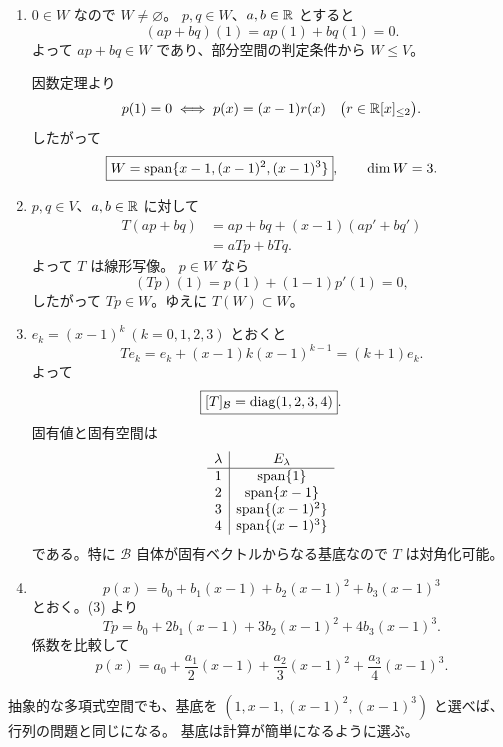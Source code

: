 \begin{enumerate}
  \item \(0\in W\) なので \(W\ne\varnothing\)。
  \(p,q\in W\)、\(a,b\in\mathbb R\) とすると
  \[
  (ap+bq)(1)=ap(1)+bq(1)=0.
  \]
  よって \(ap+bq\in W\) であり、部分空間の判定条件から \(W\le V\)。

  因数定理より
  \[
  p(1)=0\iff p(x)=(x-1)r(x)
  \quad\bigl(r\in\mathbb R[x]_{\le2}\bigr).
  \]
  したがって
  \[
  \boxed{W=\operatorname{span}\{x-1,(x-1)^2,(x-1)^3\}},\qquad \dim W=3.
  \]

  \item \(p,q\in V\)、\(a,b\in\mathbb R\) に対して
  \begin{align*}
  T(ap+bq)
  &=ap+bq+(x-1)(ap'+bq')\\
  &=aTp+bTq.
  \end{align*}
  よって \(T\) は線形写像。
  \(p\in W\) なら
  \[
  (Tp)(1)=p(1)+(1-1)p'(1)=0,
  \]
  したがって \(Tp\in W\)。ゆえに \(T(W)\subset W\)。

  \item \(e_k=(x-1)^k\ (k=0,1,2,3)\) とおくと
  \[
  Te_k=e_k+(x-1)k(x-1)^{k-1}=(k+1)e_k.
  \]
  よって
  \[
  \boxed{[T]_{\mathcal B}=\operatorname{diag}(1,2,3,4)}.
  \]
  固有値と固有空間は
  \[
  \begin{array}{c|c}
  \lambda&E_\lambda\\ \hline
  1&\operatorname{span}\{1\}\\
  2&\operatorname{span}\{x-1\}\\
  3&\operatorname{span}\{(x-1)^2\}\\
  4&\operatorname{span}\{(x-1)^3\}
  \end{array}
  \]
  である。特に \(\mathcal B\) 自体が固有ベクトルからなる基底なので \(T\) は対角化可能。

  \item
  \[
  p(x)=b_0+b_1(x-1)+b_2(x-1)^2+b_3(x-1)^3
  \]
  とおく。(3) より
  \[
  Tp=b_0+2b_1(x-1)+3b_2(x-1)^2+4b_3(x-1)^3.
  \]
  係数を比較して
  \[
  \boxed{
  p(x)=a_0+\frac{a_1}{2}(x-1)
  +\frac{a_2}{3}(x-1)^2+\frac{a_3}{4}(x-1)^3}.
  \]
\end{enumerate}

\begin{pointbox}[狙い]
抽象的な多項式空間でも、基底を
\((1,x-1,(x-1)^2,(x-1)^3)\) と選べば、行列の問題と同じになる。
基底は計算が簡単になるように選ぶ。
\end{pointbox}


